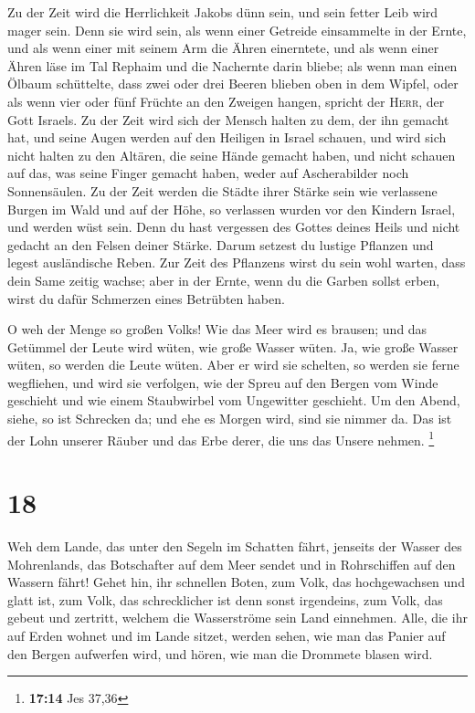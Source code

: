  Zu der Zeit wird die Herrlichkeit Jakobs dünn sein, und
sein fetter Leib wird mager sein.  Denn sie wird sein, als
wenn einer Getreide einsammelte in der Ernte, und als wenn einer mit
seinem Arm die Ähren einerntete, und als wenn einer Ähren läse im Tal
Rephaim  und die Nachernte darin bliebe; als wenn man
einen Ölbaum schüttelte, dass zwei oder drei Beeren blieben oben in dem
Wipfel, oder als wenn vier oder fünf Früchte an den Zweigen hangen,
spricht der \textsc{Herr}, der Gott Israels.  Zu der Zeit
wird sich der Mensch halten zu dem, der ihn gemacht hat, und seine Augen
werden auf den Heiligen in Israel schauen,  und wird sich
nicht halten zu den Altären, die seine Hände gemacht haben, und nicht
schauen auf das, was seine Finger gemacht haben, weder auf Ascherabilder
noch Sonnensäulen.  Zu der Zeit werden die Städte ihrer
Stärke sein wie verlassene Burgen im Wald und auf der Höhe, so verlassen
wurden vor den Kindern Israel, und werden wüst sein. 
Denn du hast vergessen des Gottes deines Heils und nicht gedacht an den
Felsen deiner Stärke. Darum setzest du lustige Pflanzen und legest
ausländische Reben.  Zur Zeit des Pflanzens wirst du sein
wohl warten, dass dein Same zeitig wachse; aber in der Ernte, wenn du
die Garben sollst erben, wirst du dafür Schmerzen eines Betrübten haben.

 O weh der Menge so großen Volks! Wie das Meer wird es
brausen; und das Getümmel der Leute wird wüten, wie große Wasser wüten.
 Ja, wie große Wasser wüten, so werden die Leute wüten.
Aber er wird sie schelten, so werden sie ferne wegfliehen, und wird sie
verfolgen, wie der Spreu auf den Bergen vom Winde geschieht und wie
einem Staubwirbel vom Ungewitter geschieht.  Um den
Abend, siehe, so ist Schrecken da; und ehe es Morgen wird, sind sie
nimmer da. Das ist der Lohn unserer Räuber und das Erbe derer, die uns
das Unsere nehmen. \footnote{\textbf{17:14} Jes 37,36}

\hypertarget{section-9}{%
\section{18}\label{section-9}}

 Weh dem Lande, das unter den Segeln im Schatten fährt,
jenseits der Wasser des Mohrenlands,  das Botschafter auf
dem Meer sendet und in Rohrschiffen auf den Wassern fährt! Gehet hin,
ihr schnellen Boten, zum Volk, das hochgewachsen und glatt ist, zum
Volk, das schrecklicher ist denn sonst irgendeins, zum Volk, das gebeut
und zertritt, welchem die Wasserströme sein Land einnehmen.
 Alle, die ihr auf Erden wohnet und im Lande sitzet,
werden sehen, wie man das Panier auf den Bergen aufwerfen wird, und
hören, wie man die Drommete blasen wird.

